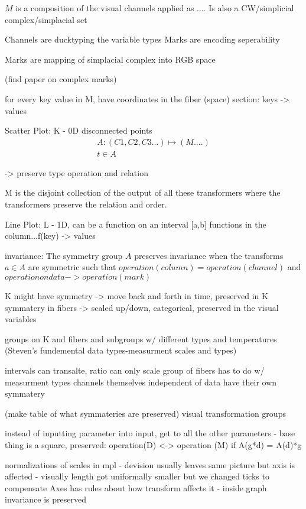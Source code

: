 $M$ is a composition of the visual channels applied as ....
Is also a CW/simplicial complex/simplacial set 

Channels are ducktyping the variable types
Marks are encoding seperability 

Marks are mapping of simplacial complex into RGB space

(find paper on complex marks)

for every key value in M, have coordinates in the fiber (space)
section: keys -> values 

Scatter Plot:
K - 0D disconnected points
\begin{multline}
A: (C1, C2, C3...)\mapsto (M....)\\
t \in A
\end{multline}

-> preserve type operation and relation

M is the disjoint collection of the output of all these transformers where the transformers preserve the relation and order. 

Line Plot:
L - 1D, can be a function on an interval [a,b]
functions in the column...f(key) -> values

invariance: The symmetry group $A$ preserves invariance when the transforms $a \in A$ are symmetric such that $operation(column) = operation(channel)$ and $operation on data -> operation (mark)$

K might have symmetry -> move back and forth in time, preserved in K
symmatery in fibers -> scaled up/down, categorical,
preserved in the visual variables

groups on K and fibers and subgroups w/ different types and temperatures (Steven's fundemental data types-measurment scales and types)

intervals can transalte, ratio can only scale
group of fibers has to do w/ measurment types
channels themselves independent of data have their own symmatery

(make table of what symmateries are preserved)
visual transformation groups

instead of inputting parameter into input, get to all the other parameters - base thing is a square, 
preserved: operation(D) <-> operation (M)
if A(g*d) = A(d)*g

normalizations of scales in mpl - devision usually leaves same picture but axis is affected - visually length got uniformally smaller but we changed ticks to compensate
Axes has rules about how transform affects it - inside graph invariance is preserved

